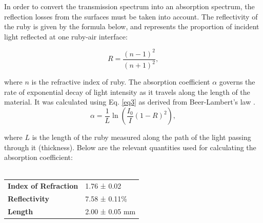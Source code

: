 \documentclass[11pt, a4paper, twocolumn]{article}
\begin{document}
In order to convert the transmission spectrum into an absorption spectrum, the reflection losses from the surfaces must be taken into account. The reflectivity of the ruby is given by the formula below, and represents the proportion of incident light reflected at one ruby-air interface:
\setlength{\abovedisplayskip}{8pt}
\setlength{\belowdisplayskip}{8pt}

\begin{equation} \label{eq2}
    R=\frac{(n-1)^2}{(n+1)^2},
\end{equation}

where $n$ is the refractive index of ruby. The absorption coefficient $\alpha$ governs the rate of exponential decay of light intensity as it travels along the length of the material. It was calculated using Eq. \ref{eq3} as derived from Beer-Lambert's law \cite{BeerLambert}.
\setlength{\abovedisplayskip}{8pt}
\setlength{\belowdisplayskip}{8pt}
\begin{equation}\label{eq3}
   \alpha = \frac{1}{L}\ln(\frac{I_0}{I}(1-R)^2),
\end{equation}

where $L$ is the length of the ruby measured along the path of the light passing through it (thickness). Below are the relevant quantities used for calculating the absorption coefficient:
\\\\
\begin{tabular}{ll}
\textbf{Index of Refraction} & 1.76 ± 0.02 \cite{rubyRefraction}    \\
\textbf{Reflectivity}        & 7.58 ± 0.11\%  \\
\textbf{Length}              & 2.00 ± 0.05 mm  
\end{tabular}
\\
\end{document}
